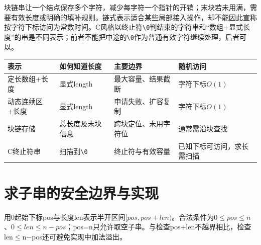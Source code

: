块链串让一个结点保存多个字符，减少每字符一个指针的开销；末块若未用满，需要有效长度或明确的填补规则。链式表示适合某些局部接入操作，却不能因此宣称按字符下标访问为常数时间。C风格以终止符\texttt{\textbackslash{}0}判结束的字符串和``数组+显式长度''的串是不同表示；前者不能把中途的\texttt{\textbackslash{}0}作为普通有效字符继续处理，后者可以。

\begin{wideblock}

\par\medskip\noindent\begin{minipage}{\linewidth}\fontsize{9.3}{12}\selectfont\begin{tabularx}{\linewidth}{@{}YYYY@{}}
\toprule\noalign{}
\begin{minipage}[b]{\linewidth}\raggedright
表示
\end{minipage} & \begin{minipage}[b]{\linewidth}\raggedright
如何知道长度
\end{minipage} & \begin{minipage}[b]{\linewidth}\raggedright
主要边界
\end{minipage} & \begin{minipage}[b]{\linewidth}\raggedright
随机访问
\end{minipage} \\
\midrule\noalign{}


定长数组+长度 & 显式length & 最大容量、结果截断 & 字符下标\(O(1)\) \\
动态连续区+长度 & 显式length & 申请失败、扩容复制 & 字符下标\(O(1)\) \\
块链存储 & 总长度及末块信息 & 跨块定位、未用字符位 & 通常需沿块查找 \\
C终止符串 & 扫描到\texttt{\textbackslash{}0} & 终止符与有效容量 & 已知下标可访问，求长需扫描 \\
\bottomrule\end{tabularx}
\end{minipage}\par\medskip

\end{wideblock}

\section{求子串的安全边界与实现}\label{DS04-substring}

\begin{methodbox}[区间先统一成起点加长度]

用0起始下标pos与长度len表示半开区间\([pos,pos+len)\)。合法条件为\(0\le pos\le n\)、\(0\le len\le n-pos\)；pos=n只允许取空子串。与检查pos+len不越界相比，检查len\ensuremath{\le}n\ensuremath{-}pos还可避免实现中加法溢出。

\end{methodbox}

